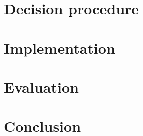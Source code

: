 \documentclass{llncs}
\begin{document}





\section{Decision procedure}




\section{Implementation}

\section{Evaluation}

\section{Conclusion}




\iffalse
\newpage
\setcounter{page}{1}

\begin{appendix}

\end{appendix}

\fi
\end{document}
